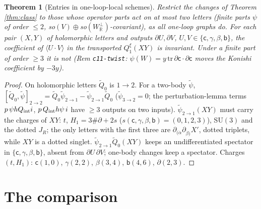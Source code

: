 \documentclass[11pt]{article}
\newtheorem{theorem}{Theorem}
\theoremstyle{definition}
\newcommand{\Qx}{Q^{\xi}}
\begin{document}
\begin{theorem}[Entries in one-loop-local schemes]\label{thm:entries}
Restrict the changes of Theorem \ref{thm:class} to those whose operator parts act on at most two letters (finite parts $\psi$ of order $\le2$, so$(V)\oplus$so$(W_{\mathbb R}^\perp)$-covariant), as all one-loop graphs do. For each pair $(X,Y)$ of holomorphic letters and outputs $\partial U,\partial V$, $U,V\in\{\mathsf c,\gamma,\beta,\mathsf b\}$, the coefficient of $\langle U\cdot V\rangle$ in the transported $\Qx_1(XY)$ is invariant. Under a finite part of order $\ge3$ it is not (Rem \texttt{c11-twist}: $\psi(W)=y\,\mathrm{tr}\,\partial\mathsf c\cdot\partial\mathsf c$ moves the Konishi coefficient by $-3y$).
\end{theorem}
\begin{proof}
On holomorphic letters $\tilde Q_0$ is $1\to2$. For a two-body $\tilde\psi$, $[\tilde Q_0,\tilde\psi]_{2\to2}=\tilde Q_0\tilde\psi_{2\to1}-\tilde\psi_{2\to1}\tilde Q_0$ ($\tilde\psi_{3\to2}=0$; the perturbation-lemma terms $p\,\psi hQ_{\rm int}i$, $p\,Q_{\rm int}h\psi\,i$ have $\ge3$ outputs on two inputs). $\tilde\psi_{2\to1}(XY)$ must carry the charges of $XY$: $t$, $H_1=3\#\partial+2s$ ($s(\mathsf c,\gamma,\beta,\mathsf b)=(0,1,2,3)$), SU$(3)$ and the dotted $J_R$; the only letters with the first three are $\partial_{(\dot\alpha}\partial_{\dot\beta)}X'$, dotted triplets, while $XY$ is a dotted singlet. $\tilde\psi_{2\to1}\tilde Q_0(XY)$ keeps an undifferentiated spectator in $\{\mathsf c,\gamma,\beta,\mathsf b\}$, absent from $\partial U\,\partial V$; one-body changes keep a spectator. Charges $(t,H_1)$: $\mathsf c(1,0)$, $\gamma(2,2)$, $\beta(3,4)$, $\mathsf b(4,6)$, $\partial(2,3)$.
\end{proof}

\section{The comparison}
\end{document}
